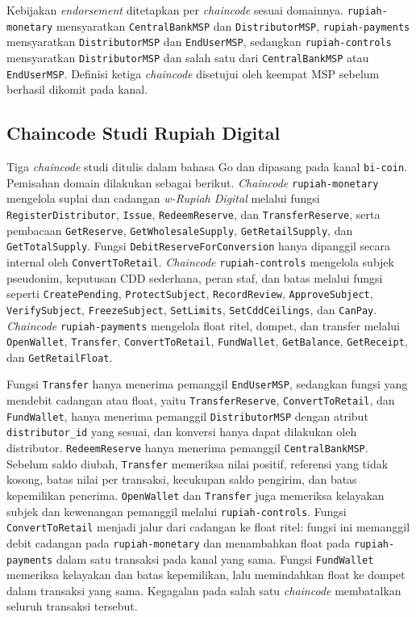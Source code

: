 Kebijakan \textit{endorsement} ditetapkan per \textit{chaincode} sesuai domainnya.
\texttt{rupiah-monetary} mensyaratkan \texttt{CentralBankMSP} dan
\texttt{DistributorMSP}, \texttt{rupiah-payments} mensyaratkan \texttt{DistributorMSP}
dan \texttt{EndUserMSP}, sedangkan \texttt{rupiah-controls} mensyaratkan
\texttt{DistributorMSP} dan salah satu dari \texttt{CentralBankMSP} atau
\texttt{EndUserMSP}. Definisi ketiga \textit{chaincode} disetujui oleh keempat MSP
sebelum berhasil dikomit pada kanal.

\subsection{Chaincode Studi Rupiah Digital}

Tiga \textit{chaincode} studi ditulis dalam bahasa Go dan dipasang pada kanal
\texttt{bi-coin}. Pemisahan domain dilakukan sebagai berikut.
\textit{Chaincode} \texttt{rupiah-monetary} mengelola suplai dan
cadangan \textit{w-Rupiah Digital} melalui fungsi \texttt{RegisterDistributor}, \texttt{Issue},
\texttt{RedeemReserve}, dan \texttt{TransferReserve}, serta pembacaan
\texttt{GetReserve}, \texttt{GetWholesaleSupply}, \texttt{GetRetailSupply}, dan \texttt{GetTotalSupply}. Fungsi \texttt{DebitReserveForConversion} hanya dipanggil secara internal oleh \texttt{ConvertToRetail}.
\textit{Chaincode} \texttt{rupiah-controls} mengelola subjek pseudonim, keputusan
CDD sederhana, peran staf, dan batas melalui fungsi seperti \texttt{CreatePending},
\texttt{ProtectSubject}, \texttt{RecordReview}, \texttt{ApproveSubject}, \texttt{VerifySubject}, \texttt{FreezeSubject},
\texttt{SetLimits}, \texttt{SetCddCeilings}, dan \texttt{CanPay}. \textit{Chaincode} \texttt{rupiah-payments}
mengelola float ritel, dompet, dan transfer melalui \texttt{OpenWallet}, \texttt{Transfer},
\texttt{ConvertToRetail}, \texttt{FundWallet}, \texttt{GetBalance}, \texttt{GetReceipt}, dan \texttt{GetRetailFloat}.

Fungsi \texttt{Transfer} hanya menerima pemanggil \texttt{EndUserMSP}, sedangkan
fungsi yang mendebit cadangan atau float, yaitu \texttt{TransferReserve}, \texttt{ConvertToRetail}, dan \texttt{FundWallet}, hanya menerima pemanggil \texttt{DistributorMSP} dengan atribut \texttt{distributor\_id} yang sesuai, dan konversi hanya dapat dilakukan oleh distributor. \texttt{RedeemReserve} hanya menerima pemanggil \texttt{CentralBankMSP}. Sebelum
saldo diubah, \texttt{Transfer} memeriksa nilai positif, referensi yang tidak kosong,
batas nilai per transaksi, kecukupan saldo pengirim, dan batas kepemilikan penerima.
\texttt{OpenWallet} dan \texttt{Transfer} juga memeriksa kelayakan subjek dan
kewenangan pemanggil melalui \texttt{rupiah-controls}. Fungsi \texttt{ConvertToRetail}
menjadi jalur dari cadangan ke float ritel: fungsi ini memanggil debit cadangan pada
\texttt{rupiah-monetary} dan menambahkan float pada \texttt{rupiah-payments} dalam satu
transaksi pada kanal yang sama. Fungsi \texttt{FundWallet} memeriksa kelayakan dan batas
kepemilikan, lalu memindahkan float ke dompet dalam transaksi yang sama. Kegagalan pada salah satu \textit{chaincode}
membatalkan seluruh transaksi tersebut.

